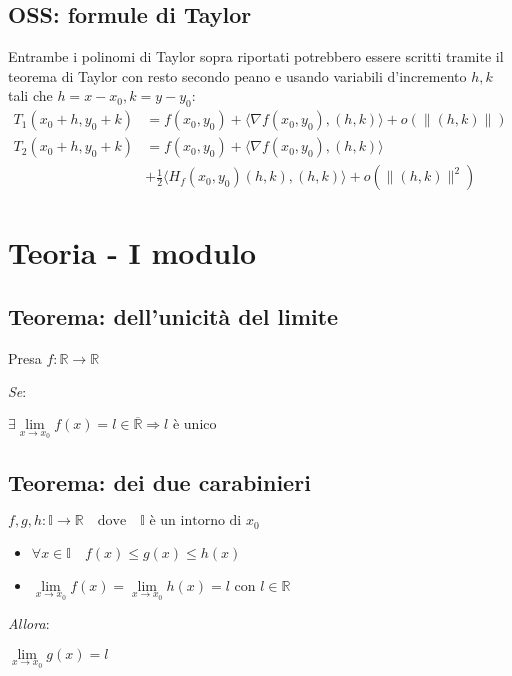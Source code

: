 \documentclass{article}
\begin{document}
\subsection{OSS: formule di Taylor}

Entrambe i polinomi di Taylor sopra riportati potrebbero essere scritti tramite il teorema di Taylor
con resto secondo peano e usando variabili d'incremento $h, k$ tali che $h = x - x_0, k = y - y_0$:
\begin{align*}
  T_1(x_0 + h, y_0 + k) &= f(x_0, y_0) + \langle \nabla f(x_0, y_0), (h, k) \rangle + o(\|(h, k)\|) \\
  T_2(x_0 + h, y_0 + k) &= f(x_0, y_0) + \langle \nabla f(x_0, y_0), (h, k) \rangle \\
    &+ \frac{1}{2} \langle H_f(x_0, y_0) (h, k), (h, k) \rangle + o(\|(h, k)\|^2)
\end{align*}

\pagebreak

\section{Teoria - I modulo}
\subsection{Teorema: dell'unicità del limite}
Presa $f: \mathbb{R} \to \mathbb{R}$

\emph{Se}:

\setlength{\parindent}{.25in}
$
  \exists \lim\limits_{x \to x_0} f(x) = l \in
  \overline{\mathbb{R}} \Longrightarrow l \text{ è unico}
$

\subsection{Teorema: dei due carabinieri}
$
  f, g, h: \mathbb{I} \longrightarrow \mathbb{R} \quad \text{dove} \quad
  \mathbb{I} \text{ è un intorno di } x_0
$

\begin{itemize}
\item
  $\forall x \in \mathbb{I} \quad f(x) \leq g(x) \leq h(x)$
\item
  $\lim\limits_{x \to x_0} f(x) = \lim\limits_{x \to x_0} h(x) = l \text{ con } l \in \mathbb{R}$
\end{itemize}

\noindent\emph{Allora}:

\setlength{\parindent}{.25in}
$\lim\limits_{x \to x_0} g(x) = l$
\end{document}
